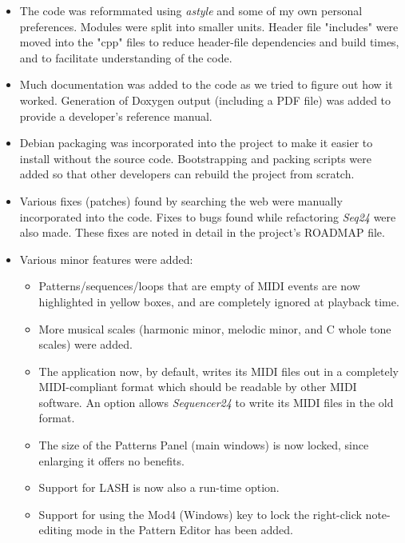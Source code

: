 \documentclass[
 11pt,
 twoside,
 a4paper,
 headinclude,
 footinclude,
 final                                 %
]{article}
\begin{document}
   \begin{itemize}
      \item The code was reformmated using \textsl{astyle} and some of my
         own personal preferences.  Modules were split into smaller units.
         Header file "includes" were moved into the "cpp" files to reduce
         header-file dependencies and build times, and to facilitate
         understanding of the code.
      \item Much documentation was added to the code as we tried to figure
         out how it worked.  Generation of Doxygen output (including a PDF
         file) was added to provide a developer's reference manual.
      \item Debian packaging was incorporated into the project to make it
         easier to install without the source code.  Bootstrapping and
         packing scripts were added so that other developers can rebuild the
         project from scratch.
      \item Various fixes (patches) found by searching the web were manually
         incorporated into the code.  Fixes to bugs found while refactoring
         \textsl{Seq24} were also made.  These fixes are noted in detail in
         the project's ROADMAP file.
      \item Various minor features were added:
      \begin{itemize}
         \item Patterns/sequences/loops that are empty of MIDI events are
            now highlighted in yellow boxes, and are completely ignored at
            playback time.
         \item More musical scales (harmonic minor, melodic minor, and
            C whole tone scales) were added.
         \item The application now, by default, writes its MIDI files out
            in a completely MIDI-compliant format which should be readable
            by other MIDI software.  An option allows \textsl{Sequencer24}
            to write its MIDI files in the old format.
         \item The size of the Patterns Panel (main windows) is now locked,
            since enlarging it offers no benefits.
         \item Support for LASH is now also a run-time option.
         \item Support for using the Mod4 (Windows) key to lock the
            right-click note-editing mode in the Pattern Editor has been
            added.
      \end{itemize}
   \end{itemize}
\end{document}
